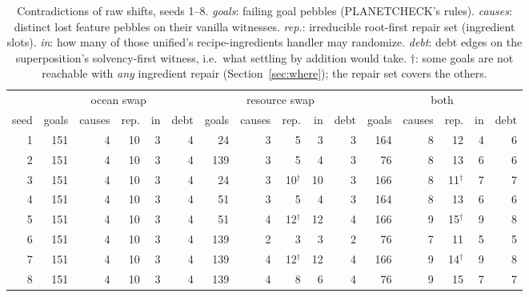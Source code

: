 \begin{table}[t]
\centering\footnotesize
\setlength{\tabcolsep}{3.2pt}
\begin{tabular}{@{}r rrrrr rrrrr rrrrr@{}}
\toprule
 & \multicolumn{5}{c}{ocean swap} & \multicolumn{5}{c}{resource swap} & \multicolumn{5}{c}{both} \\
\cmidrule(lr){2-6}\cmidrule(lr){7-11}\cmidrule(l){12-16}
seed & goals & causes & rep. & in & debt & goals & causes & rep. & in & debt & goals & causes & rep. & in & debt \\
\midrule
1 & 151 & 4 & 10 & 3 & 4 & 24 & 3 & 5 & 3 & 3 & 164 & 8 & 12 & 4 & 6 \\
2 & 151 & 4 & 10 & 3 & 4 & 139 & 3 & 5 & 4 & 3 & 76 & 8 & 13 & 6 & 6 \\
3 & 151 & 4 & 10 & 3 & 4 & 24 & 3 & 10$^{\dagger}$ & 10 & 3 & 166 & 8 & 11$^{\dagger}$ & 7 & 7 \\
4 & 151 & 4 & 10 & 3 & 4 & 51 & 3 & 5 & 4 & 3 & 164 & 8 & 13 & 6 & 6 \\
5 & 151 & 4 & 10 & 3 & 4 & 51 & 4 & 12$^{\dagger}$ & 12 & 4 & 166 & 9 & 15$^{\dagger}$ & 9 & 8 \\
6 & 151 & 4 & 10 & 3 & 4 & 139 & 2 & 3 & 3 & 2 & 76 & 7 & 11 & 5 & 5 \\
7 & 151 & 4 & 10 & 3 & 4 & 139 & 4 & 12$^{\dagger}$ & 12 & 4 & 166 & 9 & 14$^{\dagger}$ & 9 & 8 \\
8 & 151 & 4 & 10 & 3 & 4 & 139 & 4 & 8 & 6 & 4 & 76 & 9 & 15 & 7 & 7 \\
\bottomrule
\end{tabular}
\caption{Contradictions of raw shifts, seeds 1--8. \emph{goals}: failing goal pebbles (PLANETCHECK's rules). \emph{causes}: distinct lost feature pebbles on their vanilla witnesses. \emph{rep.}: irreducible root-first repair set (ingredient slots). \emph{in}: how many of those unified's recipe-ingredients handler may randomize. \emph{debt}: debt edges on the superposition's solvency-first witness, i.e.\ what settling by addition would take. $\dagger$: some goals are not reachable with \emph{any} ingredient repair (Section~\ref{sec:where}); the repair set covers the others.}
\label{tab:counts}
\end{table}

